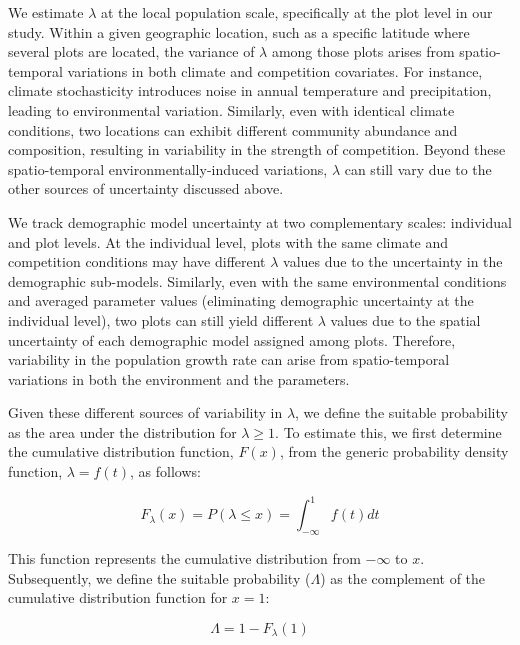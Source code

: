 \documentclass[12pt]{article}
\begin{document}
We estimate \(\lambda\) at the local population scale, specifically at
the plot level in our study. Within a given geographic location, such as
a specific latitude where several plots are located, the variance of
\(\lambda\) among those plots arises from spatio-temporal variations in
both climate and competition covariates. For instance, climate
stochasticity introduces noise in annual temperature and precipitation,
leading to environmental variation. Similarly, even with identical
climate conditions, two locations can exhibit different community
abundance and composition, resulting in variability in the strength of
competition. Beyond these spatio-temporal environmentally-induced
variations, \(\lambda\) can still vary due to the other sources of
uncertainty discussed above.

We track demographic model uncertainty at two complementary scales:
individual and plot levels. At the individual level, plots with the same
climate and competition conditions may have different \(\lambda\) values
due to the uncertainty in the demographic sub-models. Similarly, even
with the same environmental conditions and averaged parameter values
(eliminating demographic uncertainty at the individual level), two plots
can still yield different \(\lambda\) values due to the spatial
uncertainty of each demographic model assigned among plots. Therefore,
variability in the population growth rate can arise from spatio-temporal
variations in both the environment and the parameters.

Given these different sources of variability in \(\lambda\), we define
the suitable probability as the area under the distribution for
\(\lambda \geq 1\). To estimate this, we first determine the cumulative
distribution function, \(F(x)\), from the generic probability density
function, \(\lambda = f(t)\), as follows:

\begin{equation}
F_{\lambda}(x) = P(\lambda \le x) = \int_{-\infty}^{1} f(t)dt
\label{eq:cdf}\end{equation}

This function represents the cumulative distribution from \(-\infty\) to
\(x\). Subsequently, we define the suitable probability (\(\Lambda\)) as
the complement of the cumulative distribution function for \(x = 1\):

\begin{equation}
  \Lambda = 1 - F_{\lambda}(1)
\label{eq:sp}\end{equation}
\end{document}

